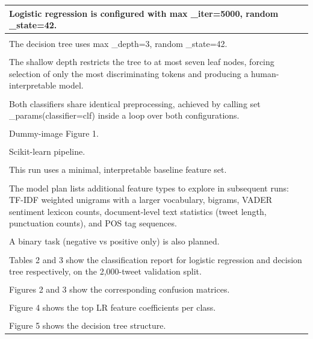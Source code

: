 \documentclass[11pt,a4paper,landscape]{article}
\begin{document}
\begin{longtable}{|p{\dimexpr\linewidth-2\tabcolsep-2\arrayrulewidth\relax}|}
\hline
Logistic regression is configured with max \_iter=5000, random \_state=42. \\[2pt]
\hline
\rule{0pt}{3.5cm} \\
\hline
The decision tree uses max \_depth=3, random \_state=42. \\[2pt]
\hline
\rule{0pt}{3.5cm} \\
\hline
The shallow depth restricts the tree to at most seven leaf nodes, forcing selection of only the most discriminating tokens and producing a human-interpretable model. \\[2pt]
\hline
\rule{0pt}{3.5cm} \\
\hline
Both classifiers share identical preprocessing, achieved by calling set \_params(classifier=clf) inside a loop over both configurations. \\[2pt]
\hline
\rule{0pt}{3.5cm} \\
\hline
Dummy-image Figure 1. \\[2pt]
\hline
\rule{0pt}{3.5cm} \\
\hline
Scikit-learn pipeline. \\[2pt]
\hline
\rule{0pt}{3.5cm} \\
\hline
This run uses a minimal, interpretable baseline feature set. \\[2pt]
\hline
\rule{0pt}{3.5cm} \\
\hline
The model plan lists additional feature types to explore in subsequent runs: TF-IDF weighted unigrams with a larger vocabulary, bigrams, VADER sentiment lexicon counts, document-level text statistics (tweet length, punctuation counts), and POS tag sequences. \\[2pt]
\hline
\rule{0pt}{3.5cm} \\
\hline
A binary task (negative vs positive only) is also planned. \\[2pt]
\hline
\rule{0pt}{3.5cm} \\
\hline
Tables 2 and 3 show the classification report for logistic regression and decision tree respectively, on the 2,000-tweet validation split. \\[2pt]
\hline
\rule{0pt}{3.5cm} \\
\hline
Figures 2 and 3 show the corresponding confusion matrices. \\[2pt]
\hline
\rule{0pt}{3.5cm} \\
\hline
Figure 4 shows the top LR feature coefficients per class. \\[2pt]
\hline
\rule{0pt}{3.5cm} \\
\hline
Figure 5 shows the decision tree structure. \\[2pt]

\end{longtable}
\end{document}
